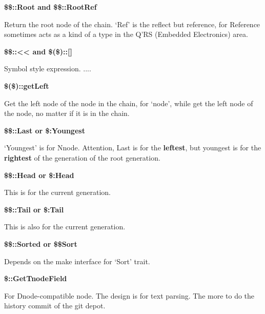 \textbf{\$\$::Root and \$\$::RootRef}

Return the root node of the chain. `Ref' is the reflect but reference, for Reference sometimes acts as a kind of a type in the Q'RS (Embedded Electronics) area.


\textbf{\$\$::<< and \$(\$)::[]}

Symbol style expression. ....


\textbf{\$(\$)::getLeft} 

Get the left node of the node in the chain, for `node', while get the left node of the node, no matter if it is in the chain.


\textbf{\$\$::Last or \$:Youngest} 

`Youngest' is for Nnode. Attention, Last is for the \textbf{leftest}, but youngest is for the \textbf{rightest} of the generation of the root generation.


\textbf{\$\$::Head or \$:Head} 

This is for the current generation.


\textbf{\$\$::Tail or \$:Tail} 

This is also for the current generation.


\textbf{\$\$::Sorted or \$\$Sort} 

Depends on the make interface for `Sort' trait.


\textbf{\$::GetTnodeField} 

For Dnode-compatible node. The design is for text parsing. The more to do the history commit of the git depot.

